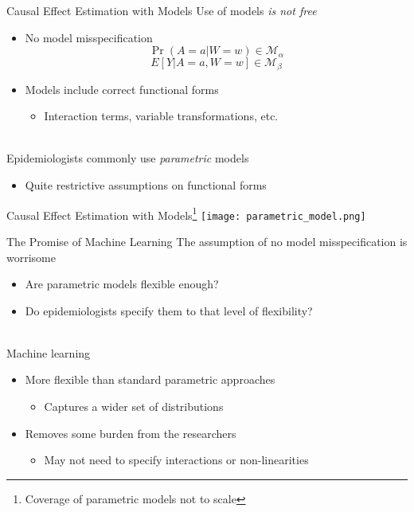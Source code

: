 \documentclass{beamer}
\begin{document}
\begin{frame}{Causal Effect Estimation with Models}
	Use of models \textit{is not free}
	\begin{itemize}
		\item No model misspecification
		$$\Pr(A=a | W=w) \in \mathcal{M}_\alpha$$
		$$E[Y | A=a, W=w] \in \mathcal{M}_\beta$$
		\item Models include correct functional forms
		\begin{itemize}
			\item Interaction terms, variable transformations, etc.
		\end{itemize}
	\end{itemize}
	~\\
	Epidemiologists commonly use \textit{parametric} models
	\begin{itemize}
		\item Quite restrictive assumptions on functional forms
	\end{itemize}
\end{frame}

\begin{frame}{Causal Effect Estimation with Models\footnote[frame]{Coverage of parametric models not to scale}}
	\centering
	\texttt{[image: parametric\_model.png]}
\end{frame}

\begin{frame}{The Promise of Machine Learning}
	The assumption of no model misspecification is worrisome
	\begin{itemize}
		\item Are parametric models flexible enough?
		\item Do epidemiologists specify them to that level of flexibility?
	\end{itemize}~\\
	Machine learning %
	\begin{itemize}
		\item More flexible than standard parametric approaches
		\begin{itemize}
			\item Captures a wider set of distributions
		\end{itemize}
		\item Removes some burden from the researchers
		\begin{itemize}
			\item May not need to specify interactions or non-linearities
		\end{itemize}
	\end{itemize}
\end{frame}
\end{document}
